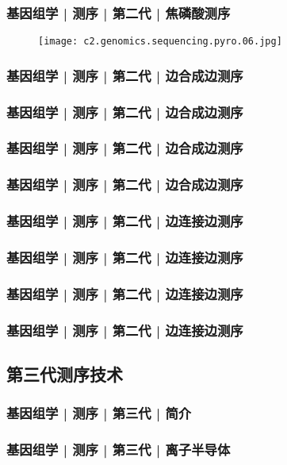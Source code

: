 \begin{frame}
  \frametitle{基因组学 | 测序 | 第二代 | 焦磷酸测序}
  \begin{figure}
    \centering
    \texttt{[image: c2.genomics.sequencing.pyro.06.jpg]}
  \end{figure}
\end{frame}

\begin{frame}[label=current]
  \frametitle{基因组学 | 测序 | 第二代 | 边合成边测序}
\end{frame}

\begin{frame}[label=current]
  \frametitle{基因组学 | 测序 | 第二代 | 边合成边测序}
\end{frame}

\begin{frame}[label=current]
  \frametitle{基因组学 | 测序 | 第二代 | 边合成边测序}
\end{frame}

\begin{frame}[label=current]
  \frametitle{基因组学 | 测序 | 第二代 | 边合成边测序}
\end{frame}

\begin{frame}[label=current]
  \frametitle{基因组学 | 测序 | 第二代 | 边连接边测序}
\end{frame}

\begin{frame}[label=current]
  \frametitle{基因组学 | 测序 | 第二代 | 边连接边测序}
\end{frame}

\begin{frame}[label=current]
  \frametitle{基因组学 | 测序 | 第二代 | 边连接边测序}
\end{frame}

\begin{frame}[label=current]
  \frametitle{基因组学 | 测序 | 第二代 | 边连接边测序}
\end{frame}

\subsection{第三代测序技术}
\begin{frame}[label=current]
  \frametitle{基因组学 | 测序 | 第三代 | 简介}
\end{frame}

\begin{frame}[label=current]
  \frametitle{基因组学 | 测序 | 第三代 | 离子半导体}
\end{frame}


